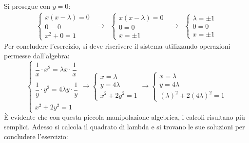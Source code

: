 \documentclass[a4paper]{article}
\begin{document}
	Si prosegue con $y=0$:
	\begin{equation*}
		\begin{array}{lllll}
			\begin{cases}
				x\left(x-\lambda\right) = 0 \\
				0 = 0 \\
				x^{2} + 0 = 1
			\end{cases}
			&\longrightarrow&
			\begin{cases}
				x\left(x-\lambda\right) = 0 \\
				0 = 0 \\
				x = \pm 1
			\end{cases}
			&\longrightarrow&
			\begin{cases}
				\lambda = \pm 1 \\
				0 = 0 \\
				x = \pm 1 
			\end{cases}
		\end{array}
	\end{equation*}
	Per concludere l'esercizio, si deve riscrivere il sistema utilizzando operazioni permesse dall'algebra:
	\begin{equation*}
		\begin{cases}
			\dfrac{1}{x} \cdot x^{2} = \lambda x \cdot \dfrac{1}{x} \\
			\\
			\dfrac{1}{y} \cdot y^{2} = 4\lambda y \cdot \dfrac{1}{y} \\
			\\
			x^{2} + 2y^{2} = 1
		\end{cases}
		\longrightarrow
		\begin{cases}
			x = \lambda \\
			y = 4\lambda \\
			x^{2} + 2y^{2} = 1
		\end{cases}
		\longrightarrow
		\begin{cases}
			x = \lambda \\
			y = 4\lambda \\
			\left(\lambda\right)^{2} + 2\left(4\lambda\right)^{2} = 1
		\end{cases}
	\end{equation*}
	È evidente che con questa piccola manipolazione algebrica, i calcoli risultano più semplici. Adesso si calcola il quadrato di lambda e si trovano le sue soluzioni per concludere l'esercizio:
\end{document}

